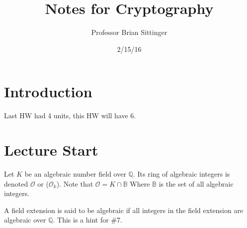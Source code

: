 \documentclass{article}
\title{Notes for Cryptography}
\author{Professor Brian Sittinger}
\date{2/15/16}
\begin{document}
\maketitle
\section{Introduction}
Last HW had 4 units, this HW will have 6. 

\section{Lecture Start}
Let $K$ be an algebraic number field over $\mathbb{Q}$. Its ring of algebraic
integers is denoted $\mathcal{O}$ or ($\mathcal{O}_k$). 
Note that $\mathcal{O} = K \cap \mathbb{B}$ Where $\mathbb{B}$ is the set of all
algebraic integers. 

A field extension is
said to be algebraic if all integers in the field extension are algebraic over
$\mathbb{Q}$. This is a hint for \#7. 
\end{document}
